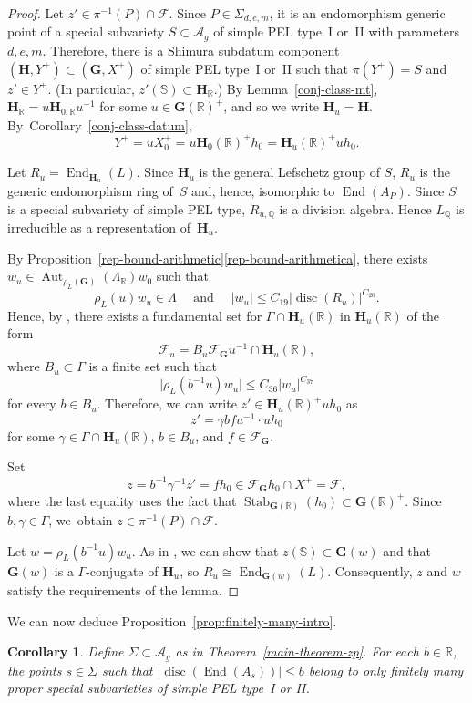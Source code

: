 \documentclass[11pt]{article}
\numberwithin{equation}{section}
\newcommand{\bQ}{\mathbb{Q}}
\newcommand{\bR}{\mathbb{R}}
\newcommand{\bS}{\mathbb{S}}
\newcommand{\cF}{\mathcal{F}}
\newcommand{\Ag}{\mathcal{A}_g}
\newcommand{\gG}{\mathbf{G}}
\newcommand{\gH}{\mathbf{H}}
\DeclareMathOperator{\Aut}{Aut}
\DeclareMathOperator{\disc}{disc}
\DeclareMathOperator{\End}{End}
\DeclareMathOperator{\Stab}{Stab}
\newcommand{\abs}[1]{\lvert #1 \rvert}
\newtheorem{corollary}[lemma]{Corollary}
\begin{document}
\begin{proof}
Let $z'\in \pi^{-1}(P)\cap\cF$.
Since $P\in\Sigma_{d,e,m}$, it is an endomorphism generic point of a special subvariety $S \subset \Ag$ of simple PEL type~I or~II with parameters $d,e,m$.
Therefore, there is a Shimura subdatum component $(\gH, Y^+) \subset (\gG, X^+)$ of simple PEL type~I or~II such that $\pi(Y^+) = S$ and $z' \in Y^+$. (In particular, $z'(\mathbb{S})\subset\gH_{\bR}$.) By Lemma~\ref{conj-class-mt}, $\gH_{\bR} = u\gH_{0,\bR}u^{-1}$ for some $u\in\gG(\bR)^+$, and so we write $\gH_u=\gH$.
By~Corol\-lary~\ref{conj-class-datum},
\[Y^+=uX^+_0=u\gH_0(\bR)^+h_0=\gH_u(\bR)^+uh_0.
\]

Let $R_u = \End_{\gH_u}(L)$.
Since $\gH_u$ is the general Lefschetz group of $S$, $R_u$ is the generic endomorphism ring of~$S$ and, hence, isomorphic to $\End(A_P)$. Since $S$ is a special subvariety of simple PEL type, $R_{u,\bQ}$ is a division algebra.
Hence $L_\bQ$ is irreducible as a representation of~$\gH_u$.

By Proposition~\ref{rep-bound-arithmetic}\eqref{rep-bound-arithmetica}, there exists $w_u \in \Aut_{\rho_L(\gG)}(\Lambda_\bR) w_0$ such that
\[
\rho_L(u) w_u \in \Lambda \quad \text{ and } \quad \abs{w_u} \leq C_{19} \abs{\disc(R_u)}^{C_{20}}.
\]
Hence, by \cite[Th.\,1.2]{QRTUI}, there exists a fundamental set for $\Gamma\cap\gH_u(\bR)$ in $\gH_u(\bR)$ of the form
\[
\cF_u=B_u\cF_\gG u^{-1}\cap\gH_u(\bR),\]
where $B_u\subset\Gamma$ is a finite set such that
\[\abs{\rho_L(b^{-1}u)w_u} \leq C_{36} \abs{w_u}^{C_{37}}\]
for every $b\in B_u$.
Therefore, we can write $z' \in \gH_u(\bR)^+ uh_0$ as
\[
z' = \gamma b f u^{-1}\cdot uh_0
\]
for some $\gamma \in \Gamma \cap \gH_u(\bR)$, $b \in B_u$, and $f \in \cF_\gG$.

Set
\[
z = b^{-1}\gamma^{-1}z' = fh_0 \in \cF_\gG h_0\cap X^+=\cF,
\]
where the last equality uses the fact that $\Stab_{\gG(\bR)}(h_0)\subset\gG(\bR)^+$.
Since $b, \gamma \in \Gamma$, we~obtain $z \in \pi^{-1}(P) \cap \cF$.

Let $w=\rho_L(b^{-1}u)w_u$.
As in \cite[Prop.\,6.3]{QRTUI}, we can show that $z(\bS) \subset \gG(w)$ and that $\gG(w)$ is a $\Gamma$-conjugate of $\gH_u$, so $R_u \cong \End_{\gG(w)}(L)$.
Consequently, $z$ and $w$ satisfy the requirements of the lemma.
\end{proof}

We can now deduce Proposition~\ref{prop:finitely-many-intro}.

\begin{corollary}\label{prop:finitely-many}
Define $\Sigma \subset \Ag$ as in Theorem~\ref{main-theorem-zp}.
For each $b\in\bR$, the points $s\in\Sigma$ such that $\abs{\disc(\End(A_s))} \leq b$ belong to only finitely many proper special subvarieties of simple PEL type~I or II.
\end{corollary}
\end{document}
